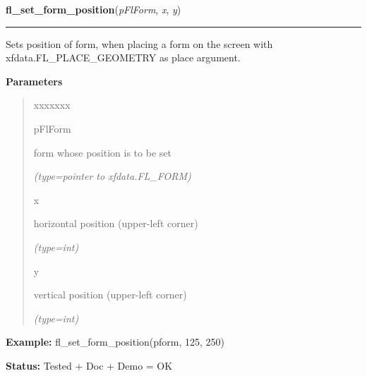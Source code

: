     \vspace{0.5ex}

\hspace{.8\funcindent}\begin{boxedminipage}{\funcwidth}

    \raggedright \textbf{fl\_set\_form\_position}(\textit{pFlForm}, \textit{x}, \textit{y})

    \vspace{-1.5ex}

    \rule{\textwidth}{0.5\fboxrule}
\setlength{\parskip}{2ex}
    Sets position of form, when placing a form on the screen with 
    xfdata.FL\_PLACE\_GEOMETRY as place argument.

\setlength{\parskip}{1ex}
      \textbf{Parameters}
      \vspace{-1ex}

      \begin{quote}
        \begin{Ventry}{xxxxxxx}

          \item[pFlForm]

          form whose position is to be set

            {\it (type=pointer to xfdata.FL\_FORM)}

          \item[x]

          horizontal position (upper-left corner)

            {\it (type=int)}

          \item[y]

          vertical position (upper-left corner)

            {\it (type=int)}

        \end{Ventry}

      \end{quote}

\textbf{Example:} fl\_set\_form\_position(pform, 125, 250)



\textbf{Status:} Tested + Doc + Demo = OK



    \end{boxedminipage}

    \label{xformslib:flbasic:fl_set_form_title}

